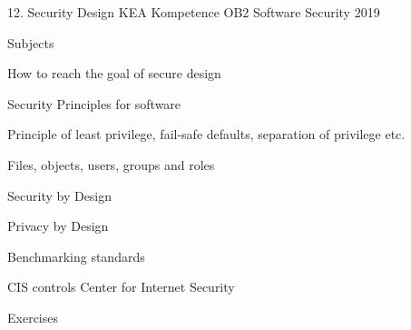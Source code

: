 \documentclass[Screen16to9,17pt]{foils}
\begin{document}
\mytitlepage
{12. Security Design}
{KEA Kompetence OB2 Software Security 2019}


\begin{list1}
\item Subjects
\begin{list2}
\item How to reach the goal of secure design
\item Security Principles for software
\item Principle of least privilege, fail-safe defaults, separation of privilege etc.
\item Files, objects, users, groups and roles
\item Security by Design
\item Privacy by Design
\item Benchmarking standards
\item CIS controls Center for Internet Security
\end{list2}
\item Exercises
\begin{list2}
\item
\end{list2}
\end{list1}


\begin{list1}
\item
\item
\end{list1}



\begin{list1}
\item
\end{list1}


\end{document}
